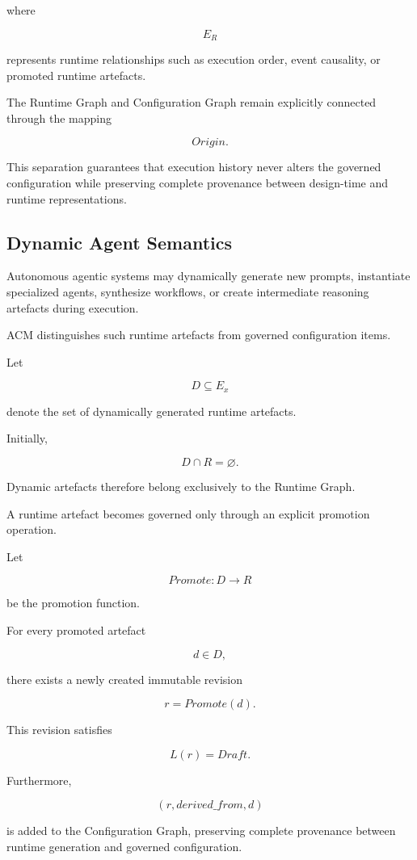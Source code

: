 \documentclass[10pt]{article}
\begin{document}
where

\[
E_R
\]

represents runtime relationships such as execution order, event causality, or promoted runtime artefacts.

The Runtime Graph and Configuration Graph remain explicitly connected through the mapping

\[
Origin.
\]

This separation guarantees that execution history never alters the governed configuration while preserving complete provenance between design-time and runtime representations.

\subsection{Dynamic Agent Semantics}
\label{sec:dynamic_agents}

Autonomous agentic systems may dynamically generate new prompts, instantiate specialized agents, synthesize workflows, or create intermediate reasoning artefacts during execution.

ACM distinguishes such runtime artefacts from governed configuration items.

Let

\[
D
\subseteq
E_x
\]

denote the set of dynamically generated runtime artefacts.

Initially,

\[
D
\cap
R
=
\varnothing.
\]

Dynamic artefacts therefore belong exclusively to the Runtime Graph.

A runtime artefact becomes governed only through an explicit promotion operation.

Let

\[
Promote
:
D
\rightarrow
R
\]

be the promotion function.

For every promoted artefact

\[
d
\in
D,
\]

there exists a newly created immutable revision

\[
r
=
Promote(d).
\]

This revision satisfies

\[
L(r)=Draft.
\]

Furthermore,

\[
(r,derived\_from,d)
\]

is added to the Configuration Graph, preserving complete provenance between runtime generation and governed configuration.
\end{document}
